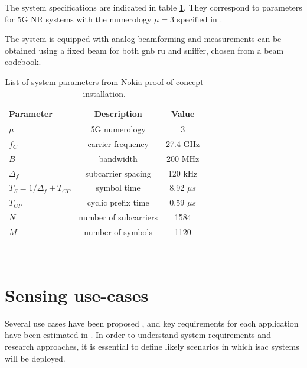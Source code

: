 	
	The system specifications are indicated in table \ref{table:PoCparams}.
	They correspond to parameters for 5G \gls{NR} systems with the numerology $\mu=3$ specified in \cite{TS138211}. 
	
	The system is equipped with analog beamforming and measurements can be obtained using a fixed beam for both \gls{gnb} \gls{ru} and sniffer, chosen from a beam codebook.
	
	\begin{table}[H]
		\centering 
		\begin{tabular}{|p{9em} c c |}
			\hline
			\rowcolor{bluepoli!40} %
			\textbf{Parameter} & \textbf{Description} & \textbf{Value}  \T\B \\
			\hline \hline
			$\mu$ & 5G numerology & 3 \T\B \\
			$f_C$ & carrier frequency & 27.4 GHz \T\B \\
			$B$ & bandwidth & 200 MHz \T\B\\
			$\Delta_f$ & subcarrier spacing & 120 kHz  \T\B\\
			$T_S = 1/\Delta_f + T_{CP}$ & symbol time & 8.92 $\mu s$  \T\B\\
			$T_{CP}$ & cyclic prefix time & 0.59 $\mu s$  \T\B\\
			$N$ & number of subcarriers & 1584  \T\B\\
			$M$ & number of symbols & 1120  \B\\
			
			\hline
		\end{tabular}
		\\[10pt]
		\caption{List of system parameters from Nokia proof of concept installation.}
		\label{table:PoCparams}
	\end{table}
	
	


\section{Sensing use-cases}

	Several use cases have been proposed \cite{Mandelli_Henninger_Bauhofer_Wild_2023}, \cite{Wang_Varshney_Gentile_Blandino_Chuang_Golmie_2022} and  key requirements for each application have been estimated in \cite{Wild_Braun_Viswanathan_2021}.
	In order to understand system requirements and research approaches, it is essential to define likely scenarios in which \gls{isac} systems will be deployed.
	
